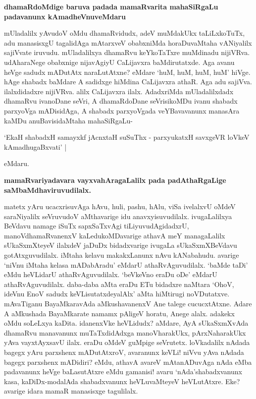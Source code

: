 {\bigskip
\noindent
{\large\bf dhamaRdoMdige baruva padada mamaRvarita mahaSiRgaLu padavanunx kAmadheVnuveMdaru}}\label{page205}
\medskip

\noindent
mUladalilx yAvudoV oMdu dhamaRvidudx, adeV muMdakUkx taLiLxkoTuTx, adu manasisxgU tagalidAga mAtarxveV obabxniMda horaDuvaMtaha vANiyalilx sajiVvate iruvudu. mUladalilxya dhamaRvu keYkoTaTxre muMdinadu nijiVRva. udAharaNege obabxnige nijavAgiyU CaLijavxra baMdirutatxde. Aga avanu heVge sadudx mADutAtx naraLutAtxne? eMdare `huM, huM, huM, huM' hiVge. hAge shabadx baMdare A sadidxge hiMdina CaLijavxra athaR. Aga adu sajiVva. ilalxdidadxre nijiVRva. alilx CaLijavxra ilalx. AdadxriMda mUladalilxdadx dhamaRvu ivanoDane seVri, A dhamaRdoDane seVrisikoMDu ivanu shabadx parxyoVga mADisidAga, A shabadx parxyoVgada veYBavavanunx manasAra kaMDu anuBavisidaMtaha mahaSiRgaLu-

\begin{shloka}
`EkaH shabadxH samayxkf jAcnxtaH suSuThx - parxyukatxH savxgeVR loVkeV kAmadhugaBxvati' |\label{205b}
\end{shloka}

\noindent
eMdaru.

{\bigskip
\noindent
{\large\bf mamaRvariyadavara vayxvahAragaLalilx pada padAthaRgaLige saMbaMdhaviruvudilalx.}}\label{page205a}
\medskip

\noindent
matetx yAru ucacxrisuvAga hAvu, huli, pashu, hAlu, viSa ivelalxvU oMdeV saraNiyalilx seVruvudoV aMthavarige idu anavxyisuvudilalx. ivugaLalilxya BeVdavu namage iSuTx sapxSaTxvAgi tiLiyuvudAgidadxrU, manoVdhamaRvanenxV kaLedukoMDavarige athavA meY managaLalilx sUkaSxmXteyeV ilalxdeV jaDuDx bidadxvarige ivugaLa sUkaSxmXBeVdavu gotAtxguvudilalx. iMtaha kelavu makakxLanunx nAvu kANabahudu. avarige `niVnu iMtaha kelasa mADabAradu' eMdarU athaRvAguvudilalx. `baMde taDi' eMdu heVLidarU athaRvAguvudilalx. `beVkeVno eraDu oDe' eMdarU athaRvAguvudilalx. daba-daba aMta eraDu ETu bidadxre naMtara `OhoV, ideVnu EnoV sadudx keVLisutatxdeyalAlx' aMta hiMtirugi noVDutatxve. mAvaTiganu BayaMkaravAda aMkushavanenxV Ane talege cucucxtAtxne. Adare A aMkushada BayaMkarate namamx pAligeV horatu, Anege alalx. adakekx oMdu soLeLxya kaDita. idanenxVke heVLidudx? aMdare, AyA sUkaSxmXvAda dhamaRvu manavanunx muTaTxdidAdxga manoVharakUkx, pArxNaharakUkx yAva vayxtAyxsavU ilalx. eraDu oMdeV guMpige seVrutetx. loVkadalilx nAdada bagegx yAru parxshenx mADutAtxroV, avaranunx keVLi! niVvu yAva nAdada bagegx parxshenx mADidiri? eMdu, athavA avareV mAtanADuvAga nAda eMba padavanunx heVge baLasutAtxre eMdu gamanisi! avaru `nAda'shabadxvanunx kasa, kaDiDx-modalAda shabadxvanunx heVLuvaMteyeV heVLutAtxre. Eke? avarige idara mamaR manasisxge tagulilalx.

